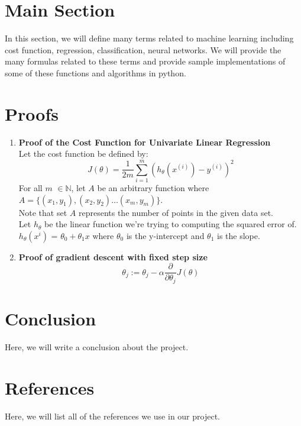 \documentclass{article}
\begin{document}
\section{Main Section}
In this section, we will define many terms related to machine learning including  cost function, regression, classification, neural networks. We will provide the many formulas related to these terms and provide sample implementations of some of these functions and algorithms in python.
\section{Proofs}
\begin{enumerate}
    \item \textbf{Proof of the Cost Function for Univariate Linear Regression}\\
    Let the cost function be defined by: \[
    J(\theta) = \frac{1}{2m} \sum_{i = 1}^{m}(h_{\theta}(x^{(i)})-y^{(i)})^{2}
    \]
    For all $m$ $\in \mathbb{N}$, let $A$ be an arbitrary function where \smallskip $A = \{ (x_1, y_1), (x_2, y_2) \dots (x_m, y_m) \}$.\\
    \smallskip Note that set $A$ represents the number of points in the given data set.\\
    \smallskip Let $h_{\theta}$ be the linear function we're trying to computing the squared error of.\\
    \smallskip $h_{\theta}(x^{i})$ = $\theta_0 + \theta_1x$ where $\theta_0$ is the y-intercept and $\theta_1$ is the slope.
    
     
    \item \textbf{Proof of gradient descent with fixed step size}
    \[
    \theta_{j} := \theta_{j} - \alpha \frac{\partial}{\partial \theta_{j}}   J(\theta)
    \]
\end{enumerate}
\section{Conclusion}
Here, we will write a conclusion about the project.
\section{References}
Here, we will list all of the references we use in our project.
\end{document}
